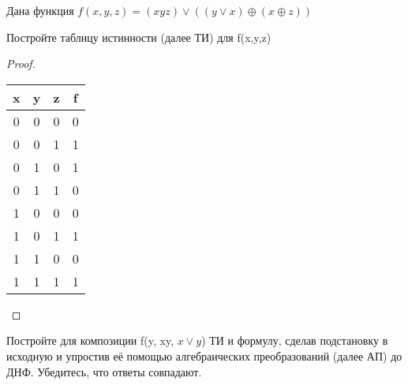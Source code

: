 
\renewcommand*{\proofname}{Решение}

$ $\\
Дана функция \(f(x,y,z)=(xyz) \lor ((y \lor x) \oplus (x \oplus z))\)
$ $\\

\begin{problem}
    Постройте таблицу истинности (далее ТИ) для f(x,y,z)
\end{problem}

\begin{proof} $ $\\
    \begin{tabular}{ccc|c}
        x & y & z & f \\
        \hline
        0 & 0 & 0 & 0 \\
        0 & 0 & 1 & 1 \\
        0 & 1 & 0 & 1 \\
        0 & 1 & 1 & 0 \\
        1 & 0 & 0 & 0 \\
        1 & 0 & 1 & 1 \\
        1 & 1 & 0 & 0 \\
        1 & 1 & 1 & 1 \\
    \end{tabular}
\end{proof}

\begin{problem}
    Постройте для композиции f(y, xy, $x \lor y$) ТИ и формулу, сделав подстановку в исходную и упростив её помощью алгебраических преобразований (далее АП) до ДНФ. Убедитесь, что ответы совпадают.
\end{problem}

